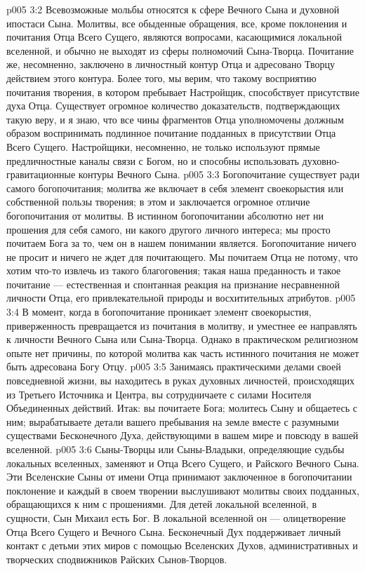 \vs p005 3:2 Всевозможные мольбы относятся к сфере Вечного Сына и духовной ипостаси Сына. Молитвы, все обыденные обращения, все, кроме поклонения и почитания Отца Всего Сущего, являются вопросами, касающимися локальной вселенной, и обычно не выходят из сферы полномочий Сына\hyp{}Творца. Почитание же, несомненно, заключено в личностный контур Отца и адресовано Творцу действием этого контура. Более того, мы верим, что такому восприятию почитания творения, в котором пребывает Настройщик, способствует присутствие духа Отца. Существует огромное количество доказательств, подтверждающих такую веру, и я знаю, что все чины фрагментов Отца уполномочены должным образом воспринимать подлинное почитание подданных в присутствии Отца Всего Сущего. Настройщики, несомненно, не только используют прямые предличностные каналы связи с Богом, но и способны использовать духовно\hyp{}гравитационные контуры Вечного Сына.
\vs p005 3:3 Богопочитание существует ради самого богопочитания; молитва же включает в себя элемент своекорыстия или собственной пользы творения; в этом и заключается огромное отличие богопочитания от молитвы. В истинном богопочитании абсолютно нет ни прошения для себя самого, ни какого другого личного интереса; мы просто почитаем Бога за то, чем он в нашем понимании является. Богопочитание ничего не просит и ничего не ждет для почитающего. Мы почитаем Отца не потому, что хотим что\hyp{}то извлечь из такого благоговения; такая наша преданность и такое почитание --- естественная и спонтанная реакция на признание несравненной личности Отца, его привлекательной природы и восхитительных атрибутов.
\vs p005 3:4 В момент, когда в богопочитание проникает элемент своекорыстия, приверженность превращается из почитания в молитву, и уместнее ее направлять к личности Вечного Сына или Сына\hyp{}Творца. Однако в практическом религиозном опыте нет причины, по которой молитва как часть истинного почитания не может быть адресована Богу Отцу.
\vs p005 3:5 Занимаясь практическими делами своей повседневной жизни, вы находитесь в руках духовных личностей, происходящих из Третьего Источника и Центра, вы сотрудничаете с силами Носителя Объединенных действий. Итак: вы почитаете Бога; молитесь Сыну и общаетесь с ним; вырабатываете детали вашего пребывания на земле вместе с разумными существами Бесконечного Духа, действующими в вашем мире и повсюду в вашей вселенной.
\vs p005 3:6 \pc Сыны\hyp{}Творцы или Сыны\hyp{}Владыки, определяющие судьбы локальных вселенных, заменяют и Отца Всего Сущего, и Райского Вечного Сына. Эти Вселенские Сыны от имени Отца принимают заключенное в богопочитании поклонение и каждый в своем творении выслушивают молитвы своих подданных, обращающихся к ним с прошениями. Для детей локальной вселенной, в сущности, Сын Михаил есть Бог. В локальной вселенной он --- олицетворение Отца Всего Сущего и Вечного Сына. Бесконечный Дух поддерживает личный контакт с детьми этих миров с помощью Вселенских Духов, административных и творческих сподвижников Райских Сынов\hyp{}Творцов.
